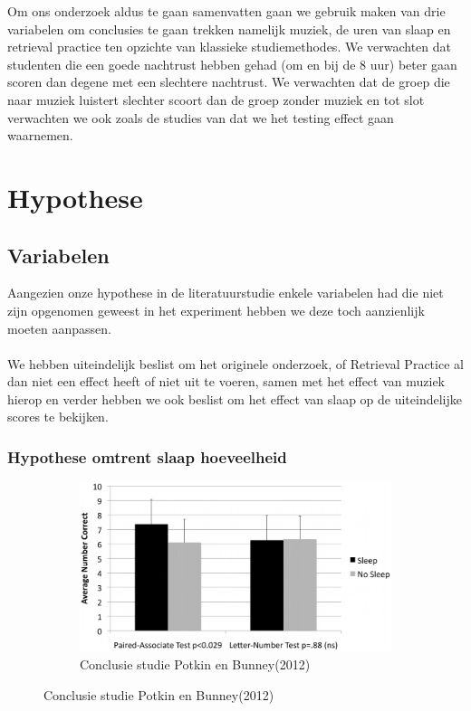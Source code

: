 \documentclass{hogent-article}
\begin{document}
\par
\noindent
Om ons onderzoek aldus te gaan samenvatten gaan we gebruik maken van drie variabelen om conclusies te gaan trekken namelijk muziek, de uren van slaap en retrieval practice ten opzichte van klassieke studiemethodes. We verwachten dat studenten die een goede nachtrust hebben gehad (om en bij de 8 uur) beter gaan scoren dan degene met een slechtere nachtrust. We verwachten dat de groep die naar muziek luistert slechter scoort dan de groep zonder muziek en tot slot verwachten we ook zoals de studies van \textcite{Roediger2006} dat we het testing effect gaan waarnemen.
\section{Hypothese}

\subsection{Variabelen}
Aangezien onze hypothese in de literatuurstudie enkele variabelen had die niet zijn opgenomen geweest in het experiment hebben we deze toch aanzienlijk moeten aanpassen.
\\
\\
\noindent
We hebben uiteindelijk beslist om het originele onderzoek, of Retrieval Practice al dan niet een effect heeft of niet uit te voeren, samen met het effect van muziek hierop en verder hebben we ook beslist om het effect van slaap op de uiteindelijke scores te bekijken.

\subsubsection{Hypothese omtrent slaap hoeveelheid}
\begin{figure}[H]
	\begin{subfigure}{0.45\textwidth}
		\includegraphics[width=\linewidth]{hypotheseGraph1}
		\caption{Conclusie studie Potkin en Bunney(2012)}
	\end{subfigure}
\end{figure}
\end{document}
